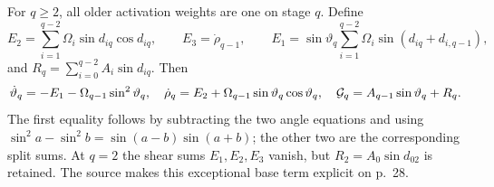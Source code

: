 For $q\ge2$, all older activation weights are one on stage $q$. Define
\[
 E_2=\sum_{i=1}^{q-2}\Omega_i\sin d_{iq}\cos d_{iq},\qquad E_3=\dot\rho_{q-1},\qquad
 E_1=\sin\vartheta_q\sum_{i=1}^{q-2}\Omega_i\sin(d_{iq}+d_{i,q-1}),
\]
and $R_q=\sum_{i=0}^{q-2}A_i\sin d_{iq}$. Then
\begin{equation}\label{cvlane:pc:eq:older}
 \dot\vartheta_q=-E_1-\Omega_{q-1}\sin^2\vartheta_q,\quad
 \dot\rho_q=E_2+\Omega_{q-1}\sin\vartheta_q\cos\vartheta_q,\quad
 \mathcal G_q=A_{q-1}\sin\vartheta_q+R_q.
\end{equation}
The first equality follows by subtracting the two angle equations and using $\sin^2a-\sin^2b=\sin(a-b)\sin(a+b)$; the other two are the corresponding split sums. At $q=2$ the shear sums $E_1,E_2,E_3$ vanish, but $R_2=A_0\sin d_{02}$ is retained. The source makes this exceptional base term explicit on p.~28.

